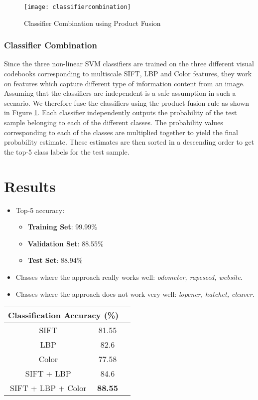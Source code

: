 \documentclass[12pt]{article}
\begin{document}
\begin{figure}
\texttt{[image: classifiercombination]}
\caption{Classifier Combination using Product Fusion}
\label{fig:classifiercombination}
\end{figure}

\subsubsection{Classifier Combination}
Since the three non-linear SVM classifiers are trained on the three different visual codebooks corresponding to multiscale SIFT, LBP and Color features, they work on features which capture different type of information content from an image. Assuming that the classifiers are independent is a safe assumption in such a scenario. We therefore fuse the classifiers using the product fusion rule as shown in Figure \ref{fig:classifiercombination}. Each classifier independently outputs the probability of the test sample belonging to each of the different classes. The probability values corresponding to each of the classes are multiplied together to yield the final probability estimate. These estimates are then sorted in a descending order to get the top-5 class labels for the test sample.

\section{Results}
\begin{itemize}
\item Top-5 accuracy:
\begin{itemize}
\item \textbf{Training Set}: 99.99\%
\item \textbf{Validation Set}: 88.55\%
\item \textbf{Test Set}: 88.94\%
\end{itemize}
\item Classes where the approach really works well: \textit{odometer, rapeseed, website}.
\item Classes where the approach does not work very well: \textit{lopener, hatchet, cleaver}.
\end{itemize}

\begin{center}
\begin{tabular}[]{| c | c | c | }
\hline
\multicolumn{2}{|c|}{\textbf{Classification Accuracy} (\%)} \\
\hline
SIFT & 81.55\\
\hline
LBP & 82.6\\
\hline
Color & 77.58\\
\hline
SIFT + LBP & 84.6\\
\hline
SIFT + LBP + Color & \textbf{88.55}\\
\hline
\end{tabular}
\end{center}



\end{document}
